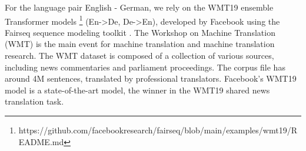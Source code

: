 
For the language pair English - German, we rely on the WMT19 ensemble Transformer models \footnote{https://github.com/facebookresearch/fairseq/blob/main/examples/wmt19/README.md} (En->De, De->En), developed by Facebook \parencite{WMT19} using the Fairseq sequence modeling
toolkit \parencite{fairseq}. The Workshop on Machine Translation (WMT) is the main event for machine translation and machine translation research. The WMT dataset is composed of a collection of various sources, including news commentaries and parliament proceedings. The corpus file has around 4M sentences, translated by professional translators. Facebook's WMT19 model is a state-of-the-art model, the winner in the WMT19 shared news translation task.









